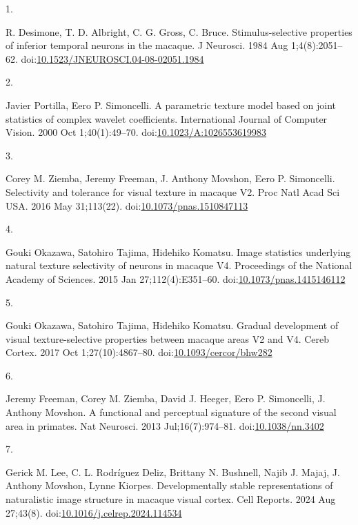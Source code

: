 \documentclass[
  10pt,
  letterpaper,
  DIV=11,
  numbers=noendperiod]{scrartcl}
\newlength{\cslhangindent}
\newlength{\csllabelwidth}
\newenvironment{CSLReferences}[2] %
 {\begin{list}{}{%
  \setlength{\itemindent}{0pt}
  \setlength{\leftmargin}{0pt}
  \setlength{\parsep}{0pt}
  \ifodd #1
   \setlength{\leftmargin}{\cslhangindent}
   \setlength{\itemindent}{-1\cslhangindent}
  \fi
  \setlength{\itemsep}{#2\baselineskip}}}
 {\end{list}}
\newcommand{\CSLLeftMargin}[1]{\parbox[t]{\csllabelwidth}{\strut#1\strut}}
\newcommand{\CSLRightInline}[1]{\parbox[t]{\linewidth - \csllabelwidth}{\strut#1\strut}}
\begin{document}
\label{refs}
\begin{CSLReferences}{0}{1}
\CSLLeftMargin{1. }%
\CSLRightInline{R. Desimone, T. D. Albright, C. G. Gross, C. Bruce.
Stimulus-selective properties of inferior temporal neurons in the
macaque. J Neurosci. 1984 Aug 1;4(8):2051--62.
doi:\href{https://doi.org/10.1523/JNEUROSCI.04-08-02051.1984}{10.1523/JNEUROSCI.04-08-02051.1984}}

\CSLLeftMargin{2. }%
\CSLRightInline{Javier Portilla, Eero P. Simoncelli. A parametric
texture model based on joint statistics of complex wavelet coefficients.
International Journal of Computer Vision. 2000 Oct 1;40(1):49--70.
doi:\href{https://doi.org/10.1023/A:1026553619983}{10.1023/A:1026553619983}}

\CSLLeftMargin{3. }%
\CSLRightInline{Corey M. Ziemba, Jeremy Freeman, J. Anthony Movshon,
Eero P. Simoncelli. Selectivity and tolerance for visual texture in
macaque V2. Proc Natl Acad Sci USA. 2016 May 31;113(22).
doi:\href{https://doi.org/10.1073/pnas.1510847113}{10.1073/pnas.1510847113}}

\CSLLeftMargin{4. }%
\CSLRightInline{Gouki Okazawa, Satohiro Tajima, Hidehiko Komatsu. Image
statistics underlying natural texture selectivity of neurons in macaque
V4. Proceedings of the National Academy of Sciences. 2015 Jan
27;112(4):E351--60.
doi:\href{https://doi.org/10.1073/pnas.1415146112}{10.1073/pnas.1415146112}}

\CSLLeftMargin{5. }%
\CSLRightInline{Gouki Okazawa, Satohiro Tajima, Hidehiko Komatsu.
Gradual development of visual texture-selective properties between
macaque areas V2 and V4. Cereb Cortex. 2017 Oct 1;27(10):4867--80.
doi:\href{https://doi.org/10.1093/cercor/bhw282}{10.1093/cercor/bhw282}}

\CSLLeftMargin{6. }%
\CSLRightInline{Jeremy Freeman, Corey M. Ziemba, David J. Heeger, Eero
P. Simoncelli, J. Anthony Movshon. A functional and perceptual signature
of the second visual area in primates. Nat Neurosci. 2013
Jul;16(7):974--81.
doi:\href{https://doi.org/10.1038/nn.3402}{10.1038/nn.3402}}

\CSLLeftMargin{7. }%
\CSLRightInline{Gerick M. Lee, C. L. Rodríguez Deliz, Brittany N.
Bushnell, Najib J. Majaj, J. Anthony Movshon, Lynne Kiorpes.
Developmentally stable representations of naturalistic image structure
in macaque visual cortex. Cell Reports. 2024 Aug 27;43(8).
doi:\href{https://doi.org/10.1016/j.celrep.2024.114534}{10.1016/j.celrep.2024.114534}}


\end{CSLReferences}
\end{document}
